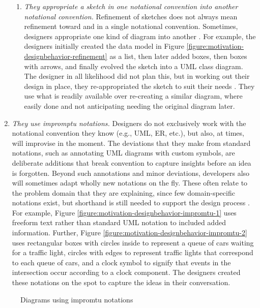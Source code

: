 \begin{enumerate}
\begin{enumerate}
\item \emph{They appropriate a sketch in one notational convention into another notational convention.} Refinement of sketches does not always mean refinement toward and in a single notational convention. Sometimes, designers appropriate one kind of diagram into another \citep{dekel2007notation}. For example, the designers initially created the data model in Figure \ref{figure:motivation-designbehavior-refinement} as a list, then later added boxes, then boxes with arrows, and finally evolved the sketch into a UML class diagram. The designer in all likelihood did not plan this, but in working out their design in place, they re-appropriated the sketch to suit their needs \citep{mangano2012design}. They use what is readily available over re-creating a similar diagram, where easily done and not anticipating needing the original diagram later. 
 \end{enumerate}

\item \emph{They use impromptu notations.} Designers do not exclusively work with the notational convention they know (e.g., UML, ER, etc.), but also, at times, will improvise in the moment. The deviations that they make from standard notations, such as annotating UML diagrams with custom symbols, are deliberate additions that break convention to capture insights before an idea is forgotten. Beyond such annotations and minor deviations, developers also will sometimes adapt wholly new notations on the fly. These often relate to the problem domain that they are explaining, since few domain-specific notations exist, but shorthand is still needed to support the design process \cite{dekel2007notation}. For example, Figure \ref{figure:motivation-designbehavior-impromtu-1} uses freeform text rather than standard UML notation to included added information. Further, Figure \ref{figure:motivation-designbehavior-impromtu-2} uses rectangular boxes with circles inside to represent a queue of cars waiting for a traffic light, circles with edges to represent traffic lights that correspond to each queue of cars, and a clock symbol to signify that events in the intersection occur according to a clock component. The designers created these notations on the spot to capture the ideas in their conversation. 

\end{enumerate}

\begin{figure}
  \centering
   \caption {Diagrams using impromtu notations}
   \label{figure:motivation-designbehavior-impromtu}
\end{figure}


